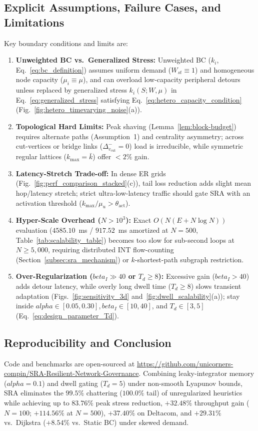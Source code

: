 \documentclass{ccjnl}
\newcommand{\rev}[1]{{\color{blue}#1}}
\def\rev#1{#1}%
\def\widetilde#1{#1}%
\def\kappa{k}%
\def\alpha{alpha}%
\def\beta{beta}%
\begin{document}
\rev{\subsection{Explicit Assumptions, Failure Cases, and Limitations}
\label{subsec:limitations}

Key boundary conditions and limits are:
\begin{enumerate}
    \item \textbf{Unweighted BC vs.\ Generalized Stress:} Unweighted BC ($\kappa_i$, Eq.~\eqref{eq:bc_definition}) assumes uniform demand ($W_{st} \equiv 1$) and homogeneous node capacity ($\mu_i \equiv \mu$), and can overload low-capacity peripheral detours unless replaced by generalized stress $\widetilde{\kappa}_i(S; W, \mu)$ in Eq.~\eqref{eq:generalized_stress} satisfying Eq.~\eqref{eq:hetero_capacity_condition} (Fig.~\ref{fig:hetero_timevarying_noise}(a)).
    \item \textbf{Topological Hard Limits:} Peak shaving (Lemma~\ref{lem:block-budget}) requires alternate paths (Assumption~1) and centrality asymmetry; across cut-vertices or bridge links ($\Delta_{v_{\text{cut}}}^- = 0$) load is irreducible, while symmetric regular lattices ($\kappa_{\max}=\bar{\kappa}$) offer $<2\%$ gain.
    \item \textbf{Latency-Stretch Trade-off:} In dense ER grids (Fig.~\ref{fig:perf_comparison_stacked}(c)), tail loss reduction adds slight mean hop/latency stretch; strict ultra-low-latency traffic should gate SRA with an activation threshold ($\kappa_{\max}/\mu_u > \theta_{\text{act}}$).
    \item \textbf{Hyper-Scale Overhead ($N > 10^3$):} Exact $O(N(E + N\log N))$ evaluation ($4585.10$~ms / $917.52$~ms amortized at $N=500$, Table~\ref{tab:scalability_table}) becomes too slow for sub-second loops at $N \ge 5{,}000$, requiring distributed INT flow-counting (Section~\ref{subsec:sra_mechanism}) or $k$-shortest-path subgraph restriction.
    \item \textbf{Over-Regularization ($\beta_I \gg 40$ or $T_d \ge 8$):} Excessive gain ($\beta_I > 40$) adds detour latency, while overly long dwell time ($T_d \ge 8$) slows transient adaptation (Figs.~\ref{fig:sensitivity_3d} and~\ref{fig:dwell_scalability}(a)); stay inside $\alpha \in [0.05, 0.30], \beta_I \in [10, 40]$, and $T_d \in [3, 5]$ (Eq.~\eqref{eq:design_parameter_Td}).
\end{enumerate}

\subsection{Reproducibility and Conclusion}
Code and benchmarks are open-sourced at \url{https://github.com/unicorners-compin/SRA-Resilient-Network-Governance}. Combining leaky-integrator memory ($\alpha=0.1$) and dwell gating ($T_d=5$) under non-smooth Lyapunov bounds, SRA eliminates the $99.5\%$ chattering ($100.0\%$ tail) of unregularized heuristics while achieving up to $83.76\%$ peak stress reduction, $+32.48\%$ throughput gain ($N=100$; $+114.56\%$ at $N=500$), $+37.40\%$ on Deltacom, and $+29.31\%$ vs.\ Dijkstra ($+8.54\%$ vs.\ Static BC) under skewed demand.}
\end{document}
